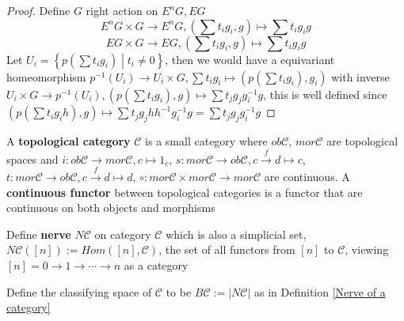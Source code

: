 \documentclass[main]{subfiles}
\begin{document}
\begin{proof}
Define $G$ right action on $E^nG,EG$
\[E^nG\times G\to E^nG, \left(\sum t_ig_i,g\right)\mapsto \sum t_ig_ig\]
\[EG\times G\to EG, \left(\sum t_ig_i,g\right)\mapsto \sum t_ig_ig\]
Let $U_i=\left\{p\left(\sum t_ig_i\right)\middle|t_i\neq0\right\}$, then we would have a equivariant homeomorphism $p^{-1}(U_i)\to U_i\times G,\sum t_ig_i\mapsto \left(p\left(\sum t_ig_i\right), g_i\right)$ with inverse $U_i\times G\to p^{-1}(U_i),\left(p\left(\sum t_ig_i\right), g\right)\mapsto \sum t_jg_jg_i^{-1}g$, this is well defined since $\left(p\left(\sum t_ig_ih\right), g\right)\mapsto \sum t_jg_jhh^{-1}g_i^{-1}g=\sum t_jg_jg_i^{-1}g$
\end{proof}

\begin{definition}
A \textbf{topological category} $\mathscr C$ is a small category where $ob\mathscr C$, $mor\mathscr C$ are topological spaces and $i:ob\mathscr C\to mor\mathscr C, c\mapsto 1_c$, $s:mor\mathscr C\to ob\mathscr C, c\xrightarrow{f}d\mapsto c$, $t:mor\mathscr C\to ob\mathscr C, c\xrightarrow{f}d\mapsto d$, $\circ:mor\mathscr C\times mor\mathscr C\to mor\mathscr C$ are continuous. A \textbf{continuous functor} between topological categories is a functor that are continuous on both objects and morphisms
\end{definition}

\begin{definition}\label{Nerve of a category}
Define \textbf{nerve} $N\mathscr C$ on category $\mathscr C$ which is also a simplicial set, $N\mathscr C([n]):=Hom([n],\mathscr C)$, the set of all functors from $[n]$ to $\mathscr C$, viewing $[n]=0\to1\to\cdots\to n$ as a category
\end{definition}

\begin{definition}
Define the classifying space of $\mathscr C$ to be $B\mathscr C:=|N\mathscr C|$ as in Definition \ref{Nerve of a category}
\end{definition}
\end{document}
